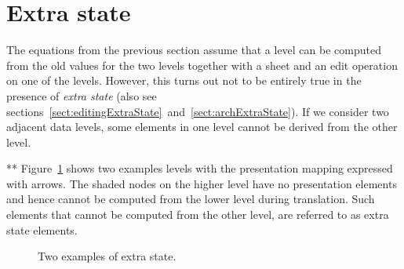 %																
%																
%																
\section{Extra state} \label{sect:extraState}



\toHere     %

The equations from the previous section assume that a level can be computed from the old values for the two levels together with a sheet and an edit operation on one of the levels. However, this turns out not to be entirely true in the presence of {\em extra state} (also see sections~\ref{sect:editingExtraState}~and~\ref{sect:archExtraState}). If we consider two adjacent data levels, some elements in one level cannot be derived from the other level. 

**
Figure~\ref{layerExtraState} shows two examples levels with the presentation mapping expressed with arrows. The shaded nodes on the higher level have no presentation elements and hence cannot be computed from the lower level during translation. Such elements that cannot be computed from the other level, are referred to as extra state elements.  


%
\begin{figure}
\begin{center}
\begin{center}
%
%
%
% 
\end{center}
\caption{Two examples of extra state.}\label{layerExtraState} 
\end{center}
\end{figure}


